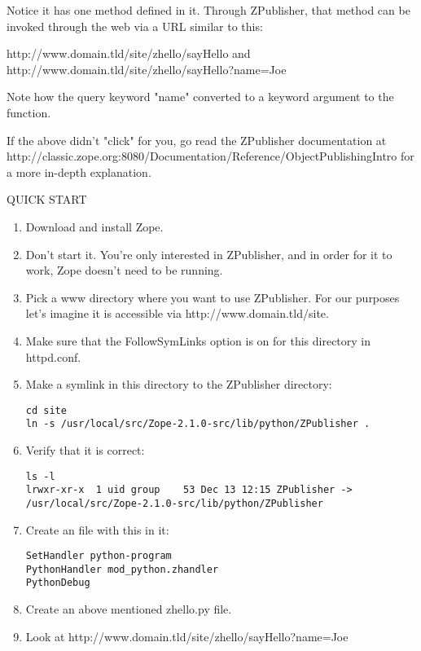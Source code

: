 Notice it has one method defined in it. Through ZPublisher, that
method can be invoked through the web via a URL similar to this:

http://www.domain.tld/site/zhello/sayHello and \\
http://www.domain.tld/site/zhello/sayHello?name=Joe

Note how the query keyword "name" converted to a keyword argument to
the function.

If the above didn't "click" for you, go read the ZPublisher
documentation at
http://classic.zope.org:8080/Documentation/Reference/ObjectPublishingIntro
for a more in-depth explanation.

QUICK START

\begin{enumerate}

\item
Download and install Zope. 

\item
Don't start it. You're only interested in ZPublisher, and in order for
it to work, Zope doesn't need to be running.

\item
Pick a www directory where you want to use ZPublisher. For our purposes
    let's imagine it is accessible via http://www.domain.tld/site. 

\item
Make sure that the FollowSymLinks option is on for this directory 
    in httpd.conf.

\item
Make a symlink in this directory to the ZPublisher directory:
\begin{verbatim}
cd site
ln -s /usr/local/src/Zope-2.1.0-src/lib/python/ZPublisher .
\end{verbatim}

\item
Verify that it is correct:
\begin{verbatim}
ls -l
lrwxr-xr-x  1 uid group    53 Dec 13 12:15 ZPublisher -> /usr/local/src/Zope-2.1.0-src/lib/python/ZPublisher
\end{verbatim}

\item
Create an  file with this in it:

\begin{verbatim}
SetHandler python-program
PythonHandler mod_python.zhandler
PythonDebug
\end{verbatim}

\item
Create an above mentioned zhello.py file.

\item
Look at http://www.domain.tld/site/zhello/sayHello?name=Joe

\end{enumerate}


